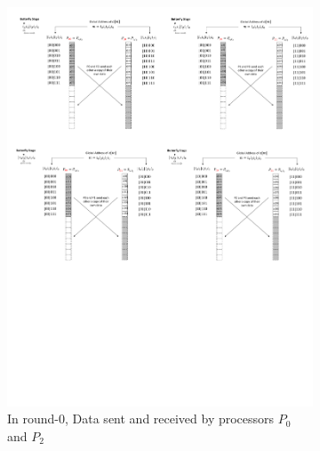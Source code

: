 \documentclass[submission]{iacrtrans}
\theoremstyle{plain}
\begin{document}
\begin{figure}[!tb]
\centering
\begin{subfigure}[b]{0.47\textwidth}
\includegraphics[width=\textwidth]{./fig/DataSwapWithoutPerm1.pdf}
\caption{In round-0, Data sent and received by processors $P_0$ and $P_2$}\label{fig:dataswap_without_perm1}
\end{subfigure}
\hspace{1em}
\begin{subfigure}[b]{.47\textwidth}\centering

\end{subfigure}
\end{figure}
\end{document}
